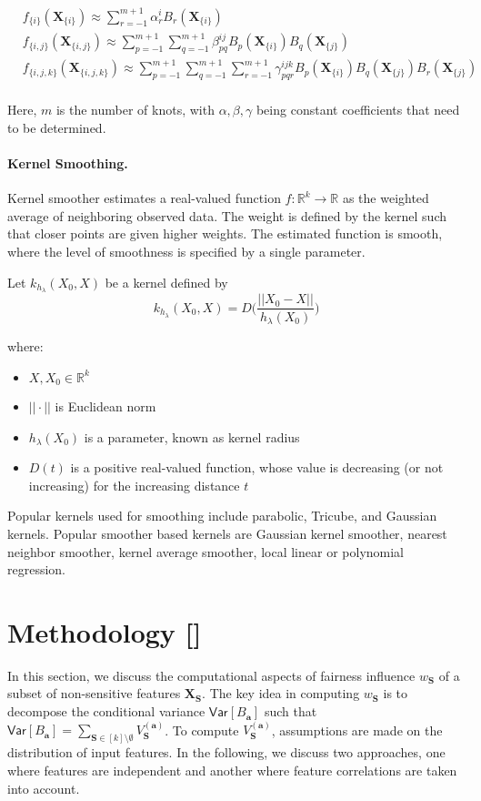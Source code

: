\begin{align*}
&f_{\{i\}} (\mathbf{X}_{\{i\}}) \approx \sum_{r=-1}^{m+1}\alpha_r^iB_r(\mathbf{X}_{\{i\}})\\
&f_{\{i, j\}} (\mathbf{X}_{\{i, j\}}) \approx \sum_{p=-1}^{m+1}\sum_{q=-1}^{m+1}\beta_{pq}^{ij}B_p(\mathbf{X}_{\{i\}})B_q(\mathbf{X}_{\{j\}})\\
&f_{\{i, j, k\}} (\mathbf{X}_{\{i, j, k\}}) \approx \sum_{p=-1}^{m+1}\sum_{q=-1}^{m+1}\sum_{r=-1}^{m+1}\gamma_{pqr}^{ijk}B_p(\mathbf{X}_{\{i\}})B_q(\mathbf{X}_{\{j\}})B_r(\mathbf{X}_{\{j\}})\\
\end{align*}

Here, $ m $ is the number of knots, with $ \alpha, \beta, \gamma $ being constant coefficients that need to be determined. 


\paragraph{Kernel Smoothing.}
Kernel smoother estimates a real-valued function $ f:\mathbb{R}^k \rightarrow \mathbb{R} $ as the weighted average of neighboring observed data. The weight is defined by the kernel such that closer points are given higher weights. The estimated function is smooth, where the level of smoothness is specified by a single parameter.

Let $ k_{h_\lambda}(X_0, X) $ be a kernel defined by
\[
k_{h_\lambda}(X_0, X) = D\Big(\frac{||X_0 - X||}{h_\lambda(X_0)}\Big)
\]

where: 
\begin{itemize}
	\item $ X, X_0 \in \mathbb{R}^k $
	\item $ ||\cdot|| $ is Euclidean norm
	\item $ h_\lambda(X_0) $ is a parameter, known as kernel radius
	\item $ D(t) $ is a positive real-valued function, whose value is decreasing (or not increasing) for the increasing distance $ t $
\end{itemize}
Popular kernels used for smoothing include parabolic, Tricube, and Gaussian kernels. Popular smoother based kernels are Gaussian kernel smoother, nearest neighbor smoother, kernel average smoother, local linear or polynomial regression.



\clearpage
\section{Methodology []}
In this section, we discuss the computational aspects of fairness influence $ w_{\mathbf{S}} $ of a subset of non-sensitive features $ \mathbf{X}_{\mathbf{S}} $. The key idea in computing $ w_{\mathbf{S}} $ is to decompose the conditional variance $ \mathsf{Var}[B_{\mathbf{a}}] $ such that $ \mathsf{Var}[B_{\mathbf{a}}] = \sum_{\mathbf{S} \in [k] \setminus \emptyset} V_{\mathbf{S}}^{(\mathbf{a})} $. To compute $ V_{\mathbf{S}}^{(\mathbf{a})} $, assumptions are made on the distribution of input features. In the following, we discuss two approaches, one where features are independent and another where feature correlations are taken into account.


